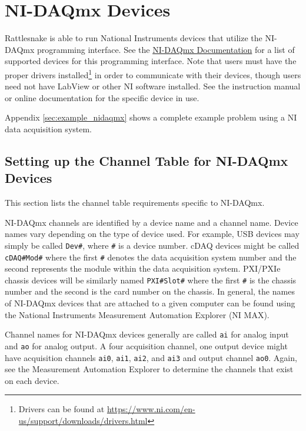 \documentclass[pdf,12pt,report]{SANDreport}
\newcommand{\inlineCode}{\lstinline[basicstyle=\bfseries\ttfamily]}
\begin{document}
    \chapter{NI-DAQmx Devices}\label{sec:rattlesnake_hardware_nidaqmx}
    Rattlesnake is able to run National Instruments devices that utilize the NI-DAQmx programming interface.  See the \href{https://www.ni.com/pdf/manuals/374768ae.html#MXSupport}{NI-DAQmx Documentation} for a list of supported devices for this programming interface.  Note that users must have the proper drivers installed\footnote{Drivers can be found at \url{https://www.ni.com/en-us/support/downloads/drivers.html}} in order to communicate with their devices, though users need not have LabView or other NI software installed.  See the instruction manual or online documentation for the specific device in use.
    
    Appendix \ref{sec:example_nidaqmx} shows a complete example problem using a NI data acquisition system.
    
    \section{Setting up the Channel Table for NI-DAQmx Devices}
    This section lists the channel table requirements specific to NI-DAQmx.
    
     NI-DAQmx channels are identified by a device name and a channel name.  Device names vary depending on the type of device used.  For example, USB devices may simply be called \inlineCode{Dev#}, where \inlineCode{#} is a device number.  cDAQ devices might be called \inlineCode{cDAQ#Mod#} where the first \inlineCode{#} denotes the data acquisition system number and the second represents the module within the data acquisition system.  PXI/PXIe chassis devices will be similarly named \inlineCode{PXI#Slot#} where the first \inlineCode{#} is the chassis number and the second is the card number on the chassis.  In general, the names of NI-DAQmx devices that are attached to a given computer can be found using the National Instruments Measurement Automation Explorer (NI MAX).
        
     Channel names for NI-DAQmx devices generally are called \inlineCode{ai} for analog input and \inlineCode{ao} for analog output.  A four acquisition channel, one output device might have acquisition channels \inlineCode{ai0}, \inlineCode{ai1}, \inlineCode{ai2}, and \inlineCode{ai3} and output channel \inlineCode{ao0}.  Again, see the Measurement Automation Explorer to determine the channels that exist on each device.
    
\end{document}

